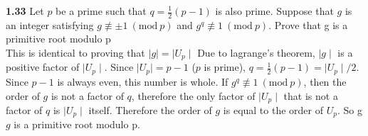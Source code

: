 \documentclass[a4paper, 11pt]{article}
\newcommand{\Mod}[1]{\ (\mathrm{mod}\ #1)}
\begin{document}
\noindent\textbf{1.33}
    Let $p$ be a prime such that $q = \frac{1}{2}\left(p-1\right)$ is also prime. Suppose that $g$ is an integer satisfying $g \not\equiv\pm 1 \Mod{p}$ and $g^q \not\equiv 1 \Mod{p}$.
    Prove that g is a primitive root modulo p\\
    
    This is identical to proving that $\mid g\mid = \mid U_p\mid$ Due to lagrange's theorem, $\mid g\mid$ is a positive factor of $\mid U_p\mid$. Since $\mid U_p\mid = p-1$ ($p$ is prime), $q=\frac{1}{2}(p-1)=\mid U_p\mid /2$. Since $p-1$ is always even, this number is whole. If $g^q \not\equiv 1 \Mod{p}$, then the order of $g$ is not a factor of $q$, therefore the only factor of $\mid U_p\mid$ that is not a factor of $q$ is $\mid U_p\mid$ itself. Therefore the order of $g$ is equal to the order of $U_p$. So g $g$ is a primitive root modulo p.
\end{document}
